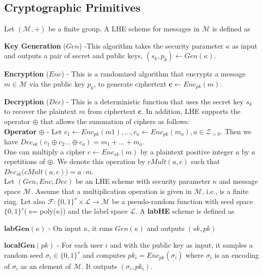 \subsection{Cryptographic Primitives}
Let $(\mathcal{M}, +)$ be a finite group. A \textsf{LHE} scheme
for messages in $\mathcal{M}$ is defined  as \squishlist
\item \textbf{Key Generation }($Gen$) -This  algorithm takes the security parameter $\kappa$ as input and outputs
a pair of secret and public keys, $(s_k, p_k) \leftarrow Gen(\kappa)$.
\item \textbf{Encryption} ($Enc$) - This is a randomized algorithm that encrypts a message $m \in \mathcal{M}$ via the public key $p_k$, to generate ciphertext $\mathbf{c} \leftarrow Enc_{pk}(m)$.
\item \textbf{Decryption} ($Dec$) - This is a deterministic function that uses the secret key $s_k$ to
recover the plaintext $m$ from ciphertext $\mathbf{c}$.
\squishend
In addition, \textsf{LHE} supports the operator $\oplus$ that allows the summation of ciphers as follows:
\\ \textbf{Operator} $\oplus$ - Let $c_1 \leftarrow Enc_{pk}(m1), \ldots, c_a \leftarrow Enc_{pk}(m_a), a \in \mathcal{Z}_{>0}$. Then we have  $Dec_{sk}(c_1\oplus c_2 ...\oplus c_a)=    m_1 + \ldots   + m_a$.  \\
One can multiply a cipher $c\leftarrow  Enc_{sk}(m)$ by a plaintext positive integer $a$ by $a$ repetitions of $\oplus$. We denote this operation by $cMult(a,c)$ such that $Dec_{sk}\big(cMult(a,c)\big)=a\cdot m$.\\
Let $(Gen,Enc,Dec)$ be an \textsf{LHE} scheme with security parameter $\kappa$ and message space $\mathcal{M}$. Assume that a multiplication operation is given in $\mathcal{M}$, i.e., is a finite ring. Let also $\mathcal{F}:\{0,1\}^s \times \mathcal{L}\rightarrow \mathcal{M}$ be a pseudo-random function with seed space $\{0,1\}^s$( s= poly($\kappa $)) and the label space $\mathcal{L}$. A \textbf{labHE} scheme is defined as
\squishlist
 \item $\textbf{labGen}(\kappa)$ - On input $\kappa$, it runs $Gen(\kappa)$ and outputs $(sk,pk)$
\item $\textbf{localGen}(pk)$ -  For each user $i$ and with the public key as input, it samples a random seed $\sigma_i \in \{0,1\}^s$ and computes $pk_i = Enc_{pk}(\underline{\sigma_i})$ where $\underline{\sigma_i}$ is an  encoding of $\sigma_i$ as an  element of $\mathcal{M}$. It outputs $(\sigma_i,pk_i)$.
